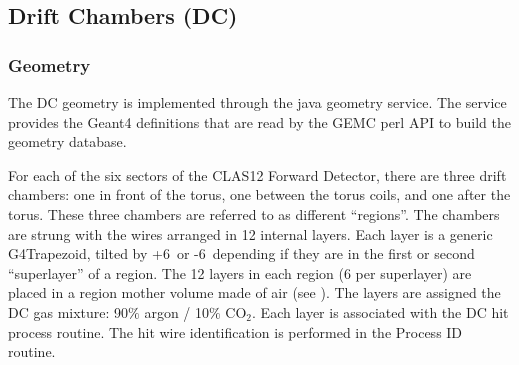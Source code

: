 \subsection{Drift Chambers (DC)}

\subsubsection{Geometry}

The DC geometry is implemented through the java geometry service.
The service provides the Geant4 definitions that are read by the GEMC perl API to build the geometry database.

For each of the six sectors of the CLAS12 Forward Detector, there are three drift chambers: one in front of the torus,
one between the torus coils, and one after the torus.  These three chambers are referred to as different ``regions''.
The chambers are strung with the wires arranged in 12 internal layers.
Each layer is a generic G4Trapezoid, tilted by +6\mdeg \ or -6\mdeg \ depending if they are in the first or second
``superlayer'' of a region.
The 12 layers in each region (6 per superlayer) are placed in a region mother volume made of air (see ).
The layers are assigned the DC gas mixture: 90$\%$ argon / 10$\%$ CO$_2$. Each layer is associated with the DC hit process routine.
The hit wire identification is performed in the Process ID routine.

